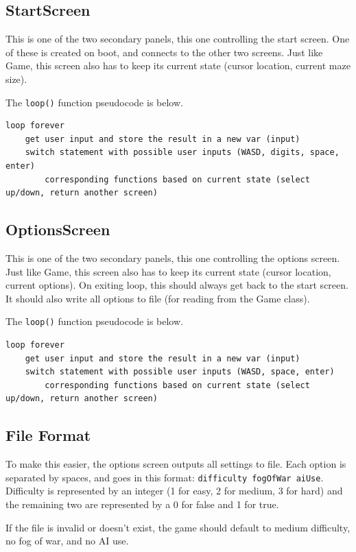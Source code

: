 \documentclass[11pt]{article} %
\begin{document}
\subsection{StartScreen}
This is one of the two secondary panels, this one controlling the start screen. One of these is created on boot, and connects to the other two screens. Just like Game, this screen also has to keep its current state (cursor location, current maze size).

The \verb|loop()| function pseudocode is below.

\begin{lstlisting}
loop forever
	get user input and store the result in a new var (input)
	switch statement with possible user inputs (WASD, digits, space, enter) 
		corresponding functions based on current state (select up/down, return another screen)
\end{lstlisting}

\subsection{OptionsScreen}
This is one of the two secondary panels, this one controlling the options screen. Just like Game, this screen also has to keep its current state (cursor location, current options). On exiting loop, this should always get back to the start screen. It should also write all options to file (for reading from the Game class). 

The \verb|loop()| function pseudocode is below.

\begin{lstlisting}
loop forever
	get user input and store the result in a new var (input)
	switch statement with possible user inputs (WASD, space, enter) 
		corresponding functions based on current state (select up/down, return another screen)
\end{lstlisting}

\subsection{File Format}
To make this easier, the options screen outputs all settings to file. Each option is separated by spaces, and goes in this format: \verb|difficulty fogOfWar aiUse|. Difficulty is represented by an integer (1 for easy, 2 for medium, 3 for hard) and the remaining two are represented by a 0 for false and 1 for true.

If the file is invalid or doesn't exist, the game should default to medium difficulty, no fog of war, and no AI use. 
\end{document}
